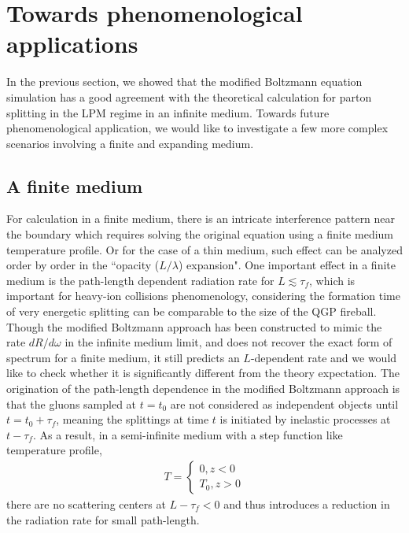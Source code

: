 \documentclass[aps, prc, reprint, amsmath, groupedaddress, nofootinbib]{revtex4-1}
\begin{document}
\section{Towards phenomenological applications}\label{section:more}
In the previous section, we showed that the modified Boltzmann equation simulation has a good agreement with the theoretical calculation for parton splitting in the LPM regime in an infinite medium.
Towards future phenomenological application, we would like to investigate a few more complex scenarios involving a finite and expanding medium.

\subsection{A finite medium}
For calculation in a finite medium, there is an intricate interference pattern near the boundary which requires solving the original equation using a finite medium temperature profile. 
Or for the case of a thin medium, such effect can be analyzed order by order in the ``opacity ($L/\lambda$) expansion". 
One important effect in a finite medium is the path-length dependent radiation rate for $L \lesssim \tau_f$, which is important for heavy-ion collisions phenomenology, considering the formation time of very energetic splitting can be comparable to the size of the QGP fireball.
Though the modified Boltzmann approach has been constructed to mimic the rate $dR/d\omega$ in the infinite medium limit, and does not recover the exact form of spectrum for a finite medium, it still predicts an $L$-dependent rate and we would like to check whether it is significantly different from the theory expectation.
The origination of the path-length dependence in the modified Boltzmann approach is that the gluons sampled at $t=t_0$ are not considered as independent objects until $t = t_0+\tau_f$, meaning the splittings at time $t$ is initiated by inelastic processes at $t-\tau_f$.
As a result, in a semi-infinite medium with a step function like temperature profile, 
\begin{eqnarray}
T = \begin{cases}
0 , z<0\\
T_0, z>0
\end{cases}
\end{eqnarray}
there are no scattering centers at $L-\tau_f<0$ and thus introduces a reduction in the radiation rate for small path-length.
\end{document}
